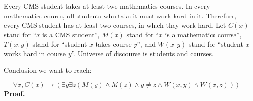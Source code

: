 \documentclass[]{article}
\begin{document}
\begin{question}{3.3}
    Every CMS student takes at least two mathematics courses. In every mathematics course, all students who take
it must work hard in it. Therefore, every CMS student has at least two courses, in which they work hard.
    \medbreak
Let $C(x)$ stand for “$x$ is a CMS student”, $M(x)$ stand for “$x$ is a mathematics course”, $T(x, y)$ stand for “student
$x$ takes course $y$”, and $W(x, y)$ stand for “student $x$ works hard in course $y$”. Universe of discourse is students
and courses.
\end{question}
\begin{center}
    Conclusion we want to reach:
\end{center}
\[
    \forall x, C(x) \rightarrow (\exists y\exists z (M(y) \land M(z) \land y \ne z \land W(x, y) \land W(x, z)))
\]
\underline{\textbf{Proof.}}
\end{document}
